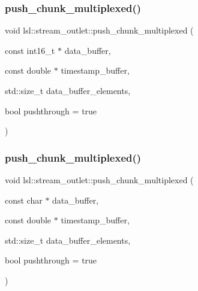 \mbox{\label{classlsl_1_1stream__outlet_ac90405c89feb8c95a493f42a0c749421}} 
\subsubsection{\texorpdfstring{push\+\_\+chunk\+\_\+multiplexed()}{push\_chunk\_multiplexed()}\hspace{0.1cm}{\footnotesize\ttfamily [26/28]}}
{\footnotesize\ttfamily void lsl\+::stream\+\_\+outlet\+::push\+\_\+chunk\+\_\+multiplexed (\begin{DoxyParamCaption}\item[{const int16\+\_\+t $\ast$}]{data\+\_\+buffer,  }\item[{const double $\ast$}]{timestamp\+\_\+buffer,  }\item[{std\+::size\+\_\+t}]{data\+\_\+buffer\+\_\+elements,  }\item[{bool}]{pushthrough = {\ttfamily true} }\end{DoxyParamCaption})\hspace{0.3cm}{\ttfamily [inline]}}

\mbox{\label{classlsl_1_1stream__outlet_a6ff877ac1b4c96f38ac36a2319a874da}} 
\subsubsection{\texorpdfstring{push\+\_\+chunk\+\_\+multiplexed()}{push\_chunk\_multiplexed()}\hspace{0.1cm}{\footnotesize\ttfamily [27/28]}}
{\footnotesize\ttfamily void lsl\+::stream\+\_\+outlet\+::push\+\_\+chunk\+\_\+multiplexed (\begin{DoxyParamCaption}\item[{const char $\ast$}]{data\+\_\+buffer,  }\item[{const double $\ast$}]{timestamp\+\_\+buffer,  }\item[{std\+::size\+\_\+t}]{data\+\_\+buffer\+\_\+elements,  }\item[{bool}]{pushthrough = {\ttfamily true} }\end{DoxyParamCaption})\hspace{0.3cm}{\ttfamily [inline]}}

